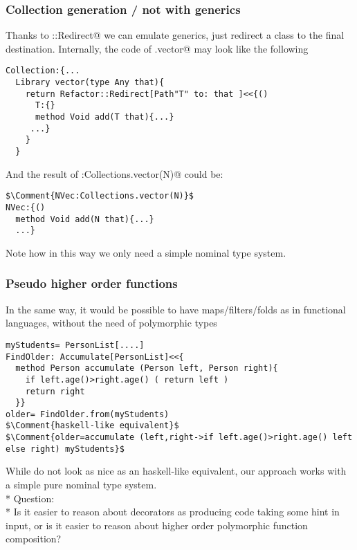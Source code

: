 \begin{frame}[fragile]
\frametitle{Collection generation / not with generics}
Thanks to \Q@Refactor::Redirect@ we can emulate generics, just redirect a class to the final destination.
Internally, the code of \Q@Collections.vector@ may look like the following
\begin{NiceCode}{59ex}{0.8}
\begin{lstlisting}
Collection:{...
  Library vector(type Any that){
    return Refactor::Redirect[Path"T" to: that ]<<{()
      T:{}
      method Void add(T that){...}
     ...}
    }
  }
\end{lstlisting}
\end{NiceCode}
And the result of \Q@NVec:Collections.vector(N)@ could be:
\begin{NiceCode}{59ex}{0.8}
\begin{lstlisting}
$\Comment{NVec:Collections.vector(N)}$
NVec:{()
  method Void add(N that){...}
  ...}
\end{lstlisting}
\end{NiceCode}


Note how in this way we only need a simple nominal type system.
\end{frame}


\begin{frame}[fragile]
\frametitle{Pseudo higher order functions}
In the same way, it would be possible to have maps/filters/folds as in functional languages, without the need of polymorphic types
\begin{NiceCode}{59ex}{0.8}
\begin{lstlisting}
myStudents= PersonList[....]
FindOlder: Accumulate[PersonList]<<{
  method Person accumulate (Person left, Person right){
    if left.age()>right.age() ( return left )
    return right
  }}
older= FindOlder.from(myStudents)
$\Comment{haskell-like equivalent}$
$\Comment{older=accumulate (left,right->if left.age()>right.age() left else right) myStudents}$
\end{lstlisting}
\end{NiceCode}
While do not look as nice as an haskell-like equivalent,
our approach works with a simple pure nominal type system.
\\*
\PresentationOnly\pause
\alert{Question:}
\\*
Is it easier to reason about decorators as producing code taking some hint in input, or
is it easier to reason about higher order polymorphic function composition?
\end{frame}


